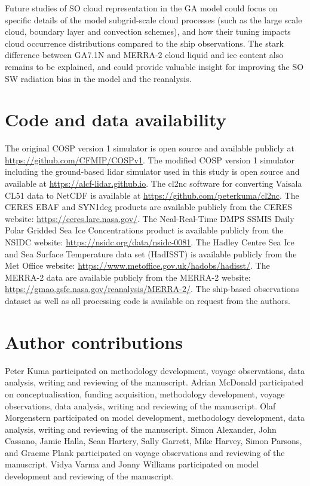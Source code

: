 Future studies of SO cloud representation in the GA model could focus on
specific details of the model subgrid-scale cloud processes (such as the large
scale cloud, boundary layer and convection schemes), and how their tuning
impacts cloud occurrence distributions compared to the ship observations. The
stark difference between GA7.1N and MERRA-2 cloud liquid and ice content also
remains to be explained, and could provide valuable insight for improving the
SO SW radiation bias in the model and the reanalysis.

\section*{Code and data availability}

The original COSP version 1 simulator is open source and available publicly at
\url{https://github.com/CFMIP/COSPv1}. The modified COSP version 1 simulator
including the ground-based lidar simulator used in this study is open source and
available at \url{https://alcf-lidar.github.io}. The cl2nc
software for converting Vaisala CL51 data to NetCDF is available at
\url{https://github.com/peterkuma/cl2nc}. The CERES EBAF and SYN1deg products
are available publicly from the CERES website:
\url{https://ceres.larc.nasa.gov/}. The Neal-Real-Time DMPS SSMIS Daily Polar
Gridded Sea Ice Concentrations product is available publicly from the NSIDC
website: \url{https://nsidc.org/data/nsidc-0081}. The Hadley Centre Sea Ice and
Sea Surface Temperature data set (HadISST) is available publicly from the Met
Office website: \url{https://www.metoffice.gov.uk/hadobs/hadisst/}. The MERRA-2
data are available publicly from the MERRA-2 website:
\url{https://gmao.gsfc.nasa.gov/reanalysis/MERRA-2/}. The ship-based
observations dataset as well as all processing code is available on request
from the authors.

\section*{Author contributions}

Peter Kuma participated on methodology development, voyage observations, data
analysis, writing and reviewing of the manuscript. Adrian McDonald participated
on conceptualisation, funding acquisition, methodology development, voyage
observations, data analysis, writing and reviewing of the manuscript. Olaf
Morgenstern participated on model development, methodology development, data
analysis, writing and reviewing of the manuscript. Simon Alexander, John
Cassano, Jamie Halla, Sean Hartery, Sally Garrett, Mike Harvey, Simon Parsons,
and Graeme Plank participated on voyage observations and reviewing of the
manuscript. Vidya Varma and Jonny Williams participated on model development
and reviewing of the manuscript.

